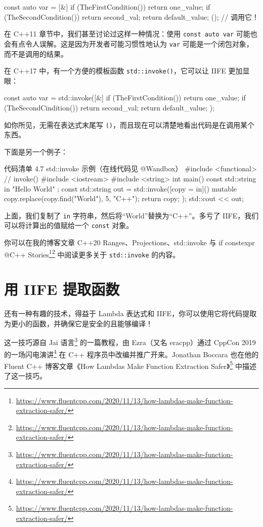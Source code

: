 \begin{codebox}
const auto var = [&] {
if (TheFirstCondition())
return one_value;
if (TheSecondCondition())
return second_val;
return default_value;
}(); // 调用它！
\end{codebox}

在 C++11 章节中，我们甚至讨论过这样一种情况：使用 \texttt{const auto var} 可能也会有点令人误解。这是因为开发者可能习惯性地认为 \texttt{var} 可能是一个闭包对象，而不是调用的结果。

在 C++17 中，有一个方便的模板函数 \texttt{std::invoke()}，它可以让 IIFE 更加显眼：

\begin{codebox}
const auto var = std::invoke([&] {
if (TheFirstCondition())
return one_value;
if (TheSecondCindition())
return second_val;
return default_value;
});
\end{codebox}

如你所见，无需在表达式末尾写 \texttt{()}，而且现在可以清楚地看出代码是在调用某个东西。

下面是另一个例子：

\begin{codeboxt}{代码清单 4.7 std::invoke 示例（在线代码见 @Wandbox）}
#include <functional> // invoke()
#include <iostream>
#include <string>
int main() {
const std::string in { "Hello World" };
const std::string out = std::invoke([copy = in]() mutable {
copy.replace(copy.find("World"), 5, "C++");
return copy;
});
std::cout << out;
}
\end{codeboxt}

上面，我们复制了 \texttt{in} 字符串，然后将“World”替换为“C++”。多亏了 IIFE，我们可以将计算出的值赋给一个 \texttt{const} 对象。

你可以在我的博客文章 C++20 Ranges、Projections、std::invoke 与 if constexpr @C++ Stories\footnote{\url{https://www.fluentcpp.com/2020/11/13/how-lambdas-make-function-extraction-safer/}}\footnote{\url{https://www.fluentcpp.com/2020/11/13/how-lambdas-make-function-extraction-safer/}} 中阅读更多关于 \texttt{std::invoke} 的内容。

\section{用 IIFE 提取函数}

还有一种有趣的技术，得益于 Lambda 表达式和 IIFE，你可以使用它将代码提取为更小的函数，并确保它是安全的且能够编译！


这一技巧源自 Jai 语言\footnote{\url{https://www.fluentcpp.com/2020/11/13/how-lambdas-make-function-extraction-safer/}} 的一篇教程，由 Ezra（又名 eracpp）通过 CppCon 2019 的一场闪电演讲\footnote{\url{https://www.fluentcpp.com/2020/11/13/how-lambdas-make-function-extraction-safer/}} 在 C++ 程序员中改编并推广开来。Jonathan Boccara 也在他的 Fluent C++ 博客文章《How Lambdas Make Function Extraction Safer》\footnote{\url{https://www.fluentcpp.com/2020/11/13/how-lambdas-make-function-extraction-safer/}} 中描述了这一技巧。

